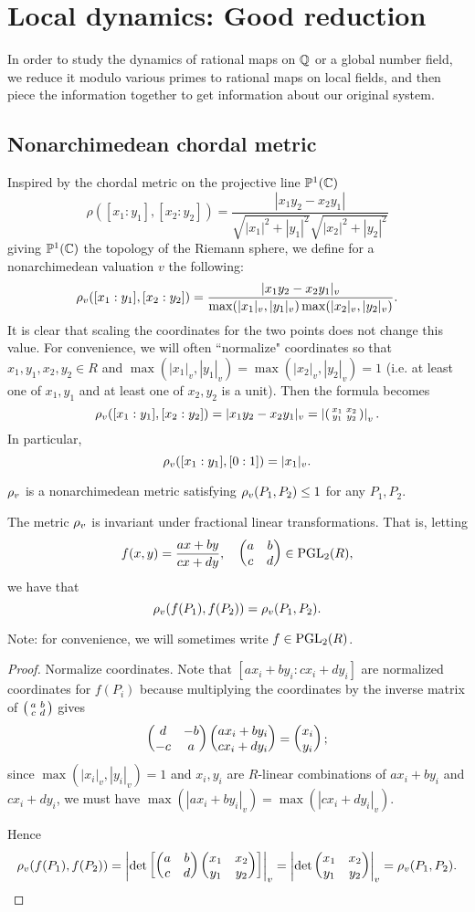 \chapter{Local dynamics: Good reduction}
In order to study the dynamics of rational maps on $\mathbb{Q}$ or a global number field, we reduce it modulo various primes to rational maps on local fields, and then piece the information together to get information about our original system. 
\section{Nonarchimedean chordal metric}
Inspired by the chordal metric on the projective line $\mathbb{P}^1(\mathbb{C})$
\[
\rho([x_1:y_1],[x_2:y_2])=\frac{|x_1y_2-x_2y_1|}{\sqrt{|x_1|^2+|y_1|^2}\sqrt{|x_2|^2+|y_2|^2}}
\]
giving $\mathbb{P}^1(\mathbb{C})$ the topology of the Riemann sphere, we define for a nonarchimedean valuation $v$ the following:
\[
\rho_v([x_1:y_1],[x_2:y_2])=\frac{|x_1y_2-x_2y_1|_v}{\max(|x_1|_v,|y_1|_v)\max(|x_2|_v,|y_2|_v)}.
\]
It is clear that scaling the coordinates for the two points does not change this value. For convenience, we will often ``normalize" coordinates so that $x_1,y_1,x_2,y_2\in R$ and $\max(|x_1|_v,|y_1|_v)=\max(|x_2|_v,|y_2|_v)=1$ (i.e. at least one of $x_1,y_1$ and at least one of $x_2,y_2$ is a unit). Then the formula becomes
\[
\rho_v([x_1:y_1],[x_2:y_2])=|x_1y_2-x_2y_1|_v=\left| {\left(\begin{smallmatrix} {x_1}&{x_2}\\ {y_1}&{y_2} \end{smallmatrix}\right)} \right|_v.
\]
In particular,
\[
\rho_v([x_1:y_1],[0:1])=|x_1|_v.
\]
\begin{pr}\label{chordal-metric-basic}
$\rho_v$ is a nonarchimedean metric satisfying $\rho_v(P_1,P_2)\le 1$ for any $P_1,P_2$.
\end{pr}
\begin{pr}\label{chordal-metric-invar}
The metric $\rho_v$ is invariant under fractional linear transformations. That is, letting 
\[
f(x,y)=\frac{ax+by}{cx+dy}, \quad \begin{pmatrix} {a}&{b}\\ {c}&{d} \end{pmatrix}\in \operatorname{PGL}_2(R),
\]
we have that
\[
\rho_v(f(P_1),f(P_2))=\rho_v(P_1,P_2).
\]
\end{pr}
Note: for convenience, we will sometimes write $f\in \operatorname{PGL}_2(R)$.
\begin{proof}
Normalize coordinates. Note that $[ax_i+by_i:cx_i+dy_i]$ are normalized coordinates for $f(P_i)$ because multiplying the coordinates by the inverse matrix of $\left(\begin{smallmatrix} {a}&{b}\\ {c}&{d} \end{smallmatrix}\right)$ gives
\[
\begin{pmatrix} {d}&{-b}\\ {-c}&{a} \end{pmatrix}\begin{pmatrix} {ax_i+by_i}\\ {cx_i+dy_i} \end{pmatrix}=\begin{pmatrix} {x_i}\\ {y_i} \end{pmatrix};
\]
since $\max(|x_i|_v,|y_i|_v)=1$ and $x_i,y_i$ are $R$-linear combinations of $ax_i+by_i$ and $cx_i+dy_i$, we must have $\max(|ax_i+by_i|_v)=\max(|cx_i+dy_i|_v)$.

Hence
\[
\rho_v(f(P_1),f(P_2))=\left| {\det\left[ {\begin{pmatrix} {a}&{b}\\ {c}&{d} \end{pmatrix}\begin{pmatrix} {x_1}&{x_2}\\ {y_1}&{y_2} \end{pmatrix}} \right]} \right|_v=\left| {\det\begin{pmatrix} {x_1}&{x_2}\\ {y_1}&{y_2} \end{pmatrix}} \right|_v=\rho_v(P_1,P_2).\qedhere
\]
\end{proof}
